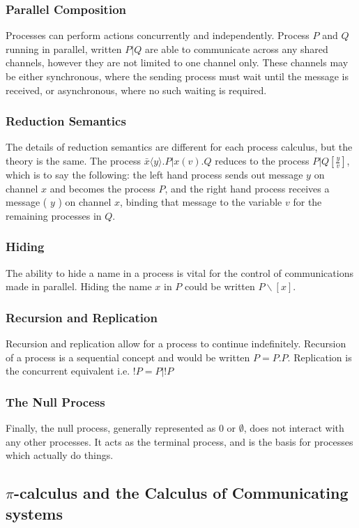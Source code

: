 \subsubsection{Parallel Composition}
Processes can perform actions concurrently and independently. Process $P$ and $Q$ running in parallel, written $P|Q$ are able to communicate across any shared channels, however they are not limited to one channel only. These channels may be either synchronous, where the sending process must wait until the message is received, or asynchronous, where no such waiting is required.

\subsubsection{Reduction Semantics}
The details of reduction semantics are different for each process calculus, but the theory is the same. The process $\bar{x}\langle y \rangle . P | x \left( v \right) . Q $ reduces to the process $P|Q\left[ \frac{y}{v} \right]$, which is to say the following: the left hand process sends out message $y$ on channel $x$ and becomes the process $P$, and the right hand process receives a message ( $y$ ) on channel $x$, binding that message to the variable $v$ for the remaining processes
in $Q$.
\subsubsection{Hiding}
The ability to hide a name in a process is vital for the control of communications made in parallel. Hiding the name $x$ in $P$ could be written $P \backslash \left[ x \right]$.
\subsubsection{Recursion and Replication}
Recursion and replication allow for a process to continue indefinitely. Recursion of a process is a sequential concept and would be written $P = P.P$. Replication is the concurrent equivalent i.e. $!P = P | !P$
\subsubsection{The Null Process}
Finally, the null process, generally represented as $0$ or $\emptyset$, does not interact with any other processes. It acts as the terminal process, and is the basis for processes which actually do things.


\subsection{$\pi$-calculus and the Calculus of Communicating systems}

